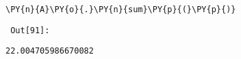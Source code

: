 {\par%
\vspace{-1\baselineskip}%
}%
\begin{notebookcell}[91]%
\begin{addmargin}[\cellleftmargin]{0em}%
{\smaller%
\par%
%
\vspace{-1\smallerfontscale}%
\begin{Verbatim}[commandchars=\\\{\}]
\PY{n}{A}\PY{o}{.}\PY{n}{sum}\PY{p}{(}\PY{p}{)}
\end{Verbatim}
%
\par%
\vspace{-1\smallerfontscale}}%
\end{addmargin}
\end{notebookcell}

\par\vspace{1\smallerfontscale}%
    
        {\par%
        \vspace{-1\smallerfontscale}%
        \noindent%
        \begin{minipage}{\cellleftmargin}%
    \hfill%
    {\smaller%
    \tt%
    \color{nbframe-out-prompt}%
    Out[91]:}%
    \hspace{\inputpadding}%
    \hspace{0em}%
    \hspace{3pt}%
    \end{minipage}%
        }%
    \begin{addmargin}[\cellleftmargin]{0em}%
    {\smaller%
    \vspace{-1\smallerfontscale}%
    
    
    
    \begin{verbatim}
22.004705986670082
    \end{verbatim}

    
}%
    \end{addmargin}%

